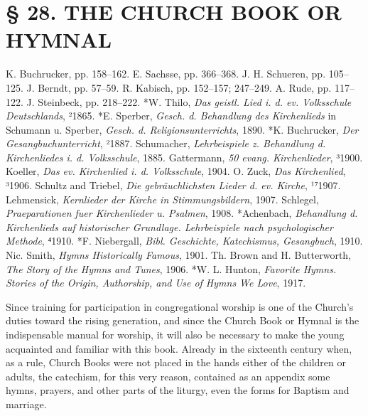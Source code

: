 \chapter{§ 28. THE CHURCH BOOK OR HYMNAL}

K. Buchrucker, pp. 158–162. E. Sachsse, pp. 366–368. J. H. Schueren, pp. 105–125. J. Berndt, pp. 57–59. R. Kabisch, pp. 152–157; 247–249. A. Rude, pp. 117–122. J. Steinbeck, pp. 218–222. *W. Thilo, \emph{Das geistl. Lied i. d. ev. Volksschule Deutschlands}, ²1865. *E. Sperber, \emph{Gesch. d. Behandlung des Kirchenlieds} in Schumann u. Sperber, \emph{Gesch. d. Religionsunterrichts}, 1890. *K. Buchrucker, \emph{Der Gesangbuchunterricht}, ²1887. Schumacher, \emph{Lehrbeispiele z. Behandlung d. Kirchenliedes i. d. Volksschule}, 1885. Gattermann, \emph{50 evang. Kirchenlieder}, ³1900. Koeller, \emph{Das ev. Kirchenlied i. d. Volksschule}, 1904. O. Zuck, \emph{Das Kirchenlied}, ³1906. Schultz and Triebel, \emph{Die gebräuchlichsten Lieder d. ev. Kirche}, ¹⁷1907. Lehmensick, \emph{Kernlieder der Kirche in Stimmungsbildern}, 1907. Schlegel, \emph{Praeparationen fuer Kirchenlieder u. Psalmen}, 1908. *Achenbach, \emph{Behandlung d. Kirchenlieds auf historischer Grundlage. Lehrbeispiele nach psychologischer Methode}, ⁴1910. *F. Niebergall, \emph{Bibl. Geschichte, Katechismus, Gesangbuch}, 1910. Nic. Smith, \emph{Hymns Historically Famous}, 1901. Th. Brown and H. Butterworth, \emph{The Story of the Hymns and Tunes}, 1906. *W. L. Hunton, \emph{Favorite Hymns. Stories of the Origin, Authorship, and Use of Hymns We Love}, 1917.

Since training for participation in congregational worship is one of the Church’s duties toward the rising generation, and since the Church Book or Hymnal is the indispensable manual for worship, it will also be necessary to make the young acquainted and familiar with this book. Already in the sixteenth century when, as a rule, Church Books were not placed in the hands either of the children or adults, the catechism, for this very reason, contained as an appendix some hymns, prayers, and other parts of the liturgy, even the forms for Baptism and marriage.

